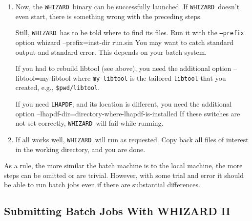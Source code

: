 \documentclass[12pt]{book}
\newenvironment{interaction}%
  {\begingroup\small
   \verbatim}%
  {\endverbatim
   \endgroup\noindent}
\newcommand{\ttt}[1]{\texttt{#1}}
\newcommand{\whizard}{\texttt{WHIZARD}}
\newcommand{\lhapdf}{\texttt{LHAPDF}}
\begin{document}
\begin{enumerate}
  for the dynamically loaded libraries contain paths that will likely
  be wrong on the batch system.  Fix this with
  \begin{interaction}
    libtool-relocate.sh --prefix inst-dir
  \end{interaction}
  If you need \lhapdf, and the library is not in the same location as
  on your host, run instead
  \begin{interaction}
    libtool-relocate.sh --prefix inst-dir --lhapdf directory-of-liblhapdf
  \end{interaction}
\item
  Now, the \whizard\ binary can be successfully launched.  If
  \whizard\ doesn't even start, there is something wrong with the preceding
  steps.  

  Still, \whizard\ has to be told where to find its files.  Run it
  with the \ttt{--prefix} option
  \begin{interaction}
    whizard --prefix=inst-dir run.sin
  \end{interaction}
  You may want to catch standard output and standard error.  This
  depends on your batch system.

  If you had to rebuild libtool (see above), you need the additional option
  \begin{interaction}
    --libtool=my-libtool
  \end{interaction}
  where \ttt{my-libtool} is the tailored \ttt{libtool} that you
  created, e.g., \ttt{\$pwd/libtool}.

  If you need \lhapdf, and its location is different, you need the
  additional option
  \begin{interaction}
    --lhapdf-dir=directory-where-lhapdf-is-installed
  \end{interaction}
  If these switches are not set correctly, \whizard\ will fail while
  running. 
\item
  If all works well, \whizard\ will run as requested.  Copy back all
  files of interest in the working directory, and you are done.
\end{enumerate}  
As a rule, the more similar the batch machine is to the local machine,
the more steps can be omitted or are trivial.  However, with some
trial and error it should be able to run batch jobs even if there are
substantial differences.



\subsection{Submitting Batch Jobs With WHIZARD II}
\end{document}
